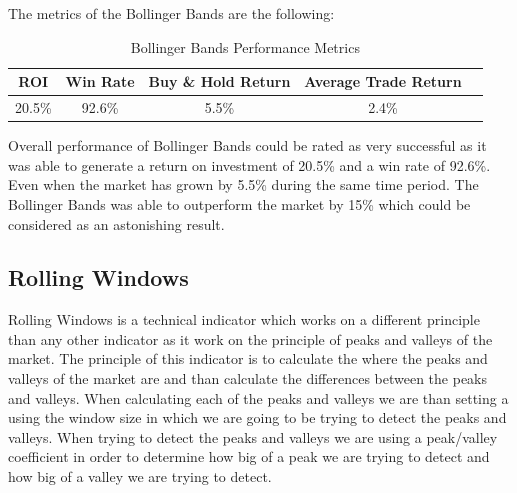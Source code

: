 \documentclass{imc-inf}
\begin{document}
	The metrics of the Bollinger Bands are the following:
	\begin{table}[h!]
		\centering
		\begin{tabular}{|c|c|c|c|c|}
			\hline
			\textbf{ROI} & \textbf{Win Rate} & \textbf{Buy \& Hold Return} & \textbf{Average Trade Return} \\ \hline
			20.5\%         & 92.6\%               & 5.5\%                         & 2.4\%                           \\ \hline
		\end{tabular}
		\caption{Bollinger Bands Performance Metrics}
		\label{tab:bollinger_bands_performance_metrics}
		
	\end{table}
	Overall performance of Bollinger Bands could be rated as very successful as it was able to generate a return on investment of 20.5\% and a win rate of 92.6\%.
	Even when the market has grown by 5.5\% during the same time period. The Bollinger Bands was able to outperform the market by 15\% which could be considered as
	an astonishing result.
	\subsection{Rolling Windows}
	Rolling Windows is a technical indicator which works on a different principle than any other indicator as it work on the principle of peaks and valleys of the market.
	The principle of this indicator is to calculate the where the peaks and valleys of the market are and than calculate the differences between the peaks and valleys.
	When calculating each of the peaks and valleys we are than setting a using the window size in which we are going to be trying to detect the peaks and valleys.
	When trying to detect the peaks and valleys we are using a peak/valley coefficient in order to determine how big of a peak we are trying to detect and how big of a valley we are trying to detect.
	
\end{document}
